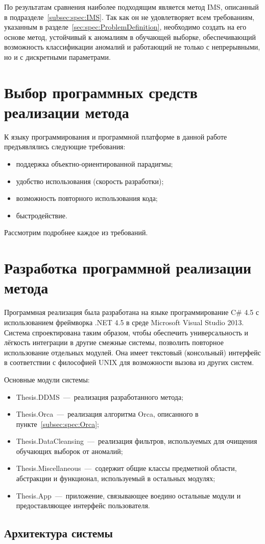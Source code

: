 По результатам сравнения наиболее подходящим является метод IMS, описанный в подразделе~\ref{subsec:spec:IMS}. Так как он не удовлетворяет всем требованиям, указанным в разделе~\ref{sec:spec:ProblemDefinition}, необходимо создать на его основе метод, устойчивый к аномалиям в обучающей выборке, обеспечивающий возможность классификации аномалий и работающий не только с непрерывными, но и с дискретными параметрами.



\section{Выбор программных средств реализации метода}

К языку программирования и программной платформе в данной работе предъявлялись следующие требования:
\begin{itemize}
	\item поддержка объектно-ориентированной парадигмы;
	\item удобство использования (скорость разработки);
	\item возможность повторного использования кода;
	\item быстродействие.
\end{itemize}

Рассмотрим подробнее каждое из требований.







\section{Разработка программной реализации метода}
Программная реализация была разработана на языке программирование C\# 4.5 с использованием фреймворка .NET 4.5 в среде Microsoft Visual Studio 2013. Система спроектирована таким образом, чтобы обеспечить универсальность и лёгкость интеграции в другие смежные системы, позволить повторное использование отдельных модулей. Она имеет текстовый (консольный) интерфейс в соответствии с философией UNIX для возможности вызова из других систем.

Основные модули системы:
\begin{itemize}
	\item Thesis.DDMS~---~реализация разработанного метода;
	\item Thesis.Orca~---~реализация алгоритма Orca, описанного в пункте~\ref{subsec:spec:Orca};
	\item Thesis.DataCleansing~---~реализация фильтров, используемых для очищения обучающих выборок от аномалий;
	\item Thesis.Miscellaneous~---~содержит общие классы предметной области, абстракции и функционал, используемый в остальных модулях;
	\item Thesis.App~---~приложение, связывающее воедино остальные модули и предоставляющее интерфейс пользователя.
\end{itemize}

\subsection{Архитектура системы}